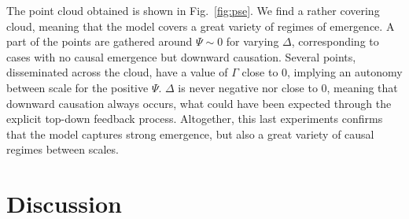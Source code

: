 \documentclass[letterpaper]{article}
\begin{document}
The point cloud obtained is shown in Fig.~\ref{fig:pse}. We find a rather covering cloud, meaning that the model covers a great variety of regimes of emergence. A part of the points are gathered around $\Psi \sim 0$ for varying $\Delta$, corresponding to cases with no causal emergence but downward causation. Several points, disseminated across the cloud, have a value of $\Gamma$ close to 0, implying an autonomy between scale for the positive $\Psi$. $\Delta$ is never negative nor close to 0, meaning that downward causation always occurs, what could have been expected through the explicit top-down feedback process. Altogether, this last experiments confirms that the model captures strong emergence, but also a great variety of causal regimes between scales.


\section{Discussion}







\end{document}
